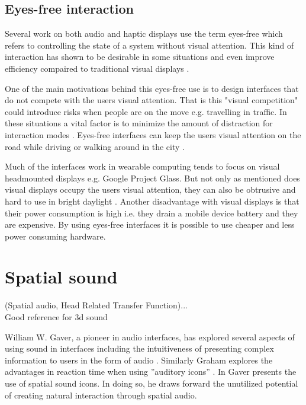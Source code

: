 \subsection{Eyes-free interaction}
Several work on both audio \cite{kajastila_eyes-free_2013,bonner_no-look_2010,brewster_multimodaleyes-freeinteraction_2003,zhao_earpod:_2007,vazquez-alvarez_eyes-free_2011} and haptic \cite{pasquero_haptic_2011,pielot_tactile_2011} displays use the term eyes-free which refers to controlling the state of a system without visual attention. This kind of interaction has shown to be desirable in some situations \cite{oakley_designing_2007,yi_exploring_2012} and even improve efficiency compaired to traditional visual displays \cite{zhao_earpod:_2007}.

One of the main motivations behind this eyes-free use is to design interfaces that do not compete with the users visual attention. That is this "visual competition" could introduce risks when people are on the move e.g. travelling in traffic. In these situations a vital factor is to minimize the amount of distraction for interaction modes \cite{pascoe_using_2000}. Eyes-free interfaces can keep the users visual attention on the road while driving \cite{sodnik_user_2008} or walking around in the city \cite{vazquez-alvarez_eyes-free_2011}.

Much of the interfaces work in wearable computing tends to focus on visual headmounted displays \cite{barfield_fundamentals_2000} e.g. Google Project Glass. But not only as mentioned does visual displays occupy the users visual attention, they can also be obtrusive and hard to use in bright daylight \cite{geelhoed_safety_2000}. Another disadvantage with visual displays is that their power consumption is high i.e. they drain a mobile device battery and they are expensive. By using eyes-free interfaces it is possible to use cheaper and less power consuming hardware.


\section{Spatial sound}
(Spatial audio, Head Related Transfer Function)...\\
Good reference for 3d sound \cite{begault_3dd_1994}

William W. Gaver, a pioneer in audio interfaces, has explored several aspects of using sound in interfaces including the intuitiveness of presenting complex information to users in the form of audio \cite{gaver_sonicfinder:_1989}. Similarly Graham explores the advantages in reaction time when using ”auditory icons” \cite{graham_use_1999}. In \cite{gaver_auditory_1986} Gaver presents the use of spatial sound icons. In doing so, he draws forward the unutilized potential of creating natural interaction through spatial audio.

